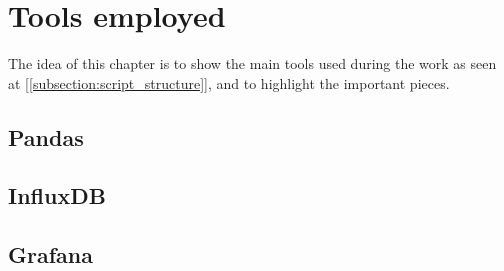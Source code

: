 \chapter{Tools employed}
The idea of this chapter is to show the main tools used during the work as seen at [\ref{subsection:script_structure}], and to highlight the important pieces.
\section{Pandas}

\section{InfluxDB}

\section{Grafana}

